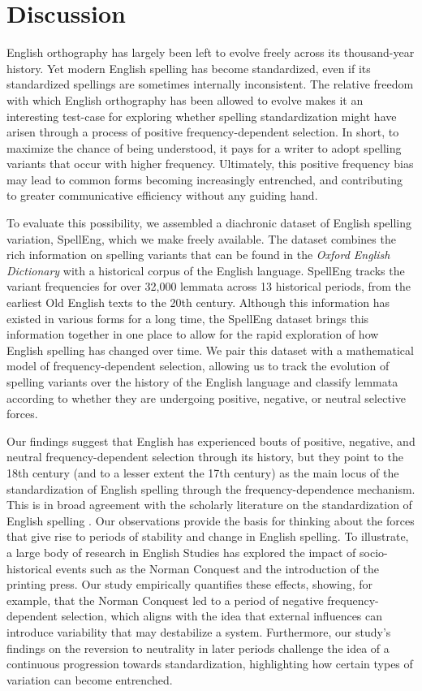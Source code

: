 \documentclass[doc,biblatex]{apa7}
\begin{document}
\section{Discussion}

English orthography has largely been left to evolve freely across its thousand-year history. Yet modern English spelling has become standardized, even if its standardized spellings are sometimes internally inconsistent. The relative freedom with which English orthography has been allowed to evolve makes it an interesting test-case for exploring whether spelling standardization might have arisen through a process of positive frequency-dependent selection. In short, to maximize the chance of being understood, it pays for a writer to adopt spelling variants that occur with higher frequency. Ultimately, this positive frequency bias may lead to common forms becoming increasingly entrenched, and contributing to greater communicative efficiency without any guiding hand.

To evaluate this possibility, we assembled a diachronic dataset of English spelling variation, SpellEng, which we make freely available. The dataset combines the rich information on spelling variants that can be found in the \textit{Oxford English Dictionary} with a historical corpus of the English language. SpellEng tracks the variant frequencies for over 32,000 lemmata across 13 historical periods, from the earliest Old English texts to the 20th century. Although this information has existed in various forms for a long time, the SpellEng dataset brings this information together in one place to allow for the rapid exploration of how English spelling has changed over time. We pair this dataset with a mathematical model of frequency-dependent selection, allowing us to track the evolution of spelling variants over the history of the English language and classify lemmata according to whether they are undergoing positive, negative, or neutral selective forces.

Our findings suggest that English has experienced bouts of positive, negative, and neutral frequency-dependent selection through its history, but they point to the 18th century (and to a lesser extent the 17th century) as the main locus of the standardization of English spelling through the frequency-dependence mechanism. This is in broad agreement with the scholarly literature on the standardization of English spelling \parencite[e.g.,][]{Scholfield:2016}. Our observations provide the basis for thinking about the forces that give rise to periods of stability and change in English spelling. To illustrate, a large body of research in English Studies has explored the impact of socio-historical events such as the Norman Conquest and the introduction of the printing press. Our study empirically quantifies these effects, showing, for example, that the Norman Conquest led to a period of negative frequency-dependent selection, which aligns with the idea that external influences can introduce variability that may destabilize a system. Furthermore, our study's findings on the reversion to neutrality in later periods challenge the idea of a continuous progression towards standardization, highlighting how certain types of variation can become entrenched.
\end{document}
